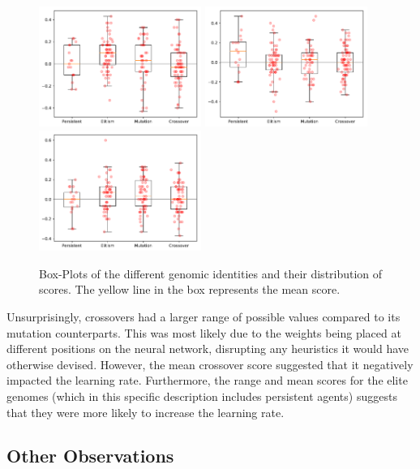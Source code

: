 \documentclass[12pt,a4paper]{article}
\begin{document}
        \begin{figure}[!ht]
            \centering
            \includegraphics[width=53mm]{images/results/1ply/champ_score_distribution.pdf}
            \includegraphics[width=53mm]{images/results/3ply/champ_score_distribution.pdf}
            \includegraphics[width=53mm]{images/results/6ply/champ_score_distribution.pdf}
            \caption{Box-Plots of the different genomic identities and their distribution of scores. The yellow line in the box represents the mean score. \label{champ_score_distribution}}
        \end{figure}

        Unsurprisingly, crossovers had a larger range of possible values compared to its mutation counterparts. This was most likely due to the weights being placed at different positions on the neural network, disrupting any heuristics it would have otherwise devised. However, the mean crossover score suggested that it negatively impacted the learning rate. Furthermore, the range and mean scores for the elite genomes (which in this specific description includes persistent agents) suggests that they were more likely to increase the learning rate.

    \subsection{Other Observations}
\end{document}
